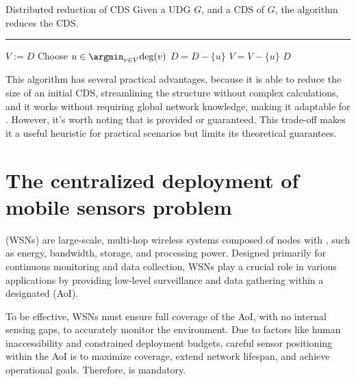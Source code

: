 \documentclass[a4paper, 12pt]{report}
\begin{document}
    \begin{framedalgo}{Distributed reduction of CDS}
        Given a UDG $G$, and a CDS of $G$, the algorithm reduces the CDS. \\
        \hrule

        \quad
        \label{alg:distributed_reduce_CDS}
        \begin{algorithmic}[1]
                \State $V := D$
                \Do
                    \State Choose $u \in \argmin_{v \in V}{\deg(v)}$
                     
                        \State $D = D - \{u\}$
                    \EndIf
                    \State $V = V - \{u\}$
                \State {} $D$
            \EndFunction
        \end{algorithmic}
    \end{framedalgo}

    This algorithm has several practical advantages, because it is able to reduce the size of an initial CDS, streamlining the structure without complex calculations, and it works without requiring global network knowledge, making it adaptable for . However, it's worth noting that  is provided or guaranteed. This trade-off makes it a useful heuristic for practical scenarios but limits its theoretical guarantees.

    \chapter{The centralized deployment of mobile sensors problem}

     (WSNs) are large-scale, multi-hop wireless systems composed of nodes with , such as energy, bandwidth, storage, and processing power. Designed primarily for continuous monitoring and data collection, WSNs play a crucial role in various applications by providing low-level surveillance and data gathering within a designated  (AoI). 

    To be effective, WSNs must ensure full coverage of the AoI, with no internal sensing gaps, to accurately monitor the environment. Due to factors like human inaccessibility and constrained deployment budgets, careful sensor positioning within the AoI is  to maximize coverage, extend network lifespan, and achieve operational goals. Therefore,  is mandatory.
\end{document}
